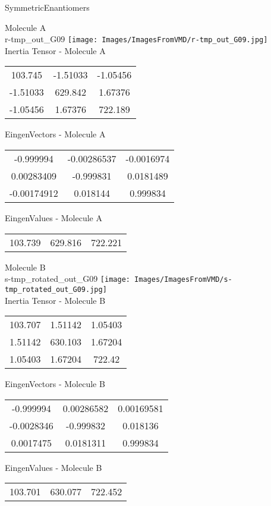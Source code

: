 \vtab[-2cm]
\begin{center}
{\large SymmetricEnantiomers}
\end{center}
\begin{multicols}{2}
\begin{center}
Molecule A \\ 
r-tmp\_out\_G09
\texttt{[image: Images/ImagesFromVMD/r-tmp\_out\_G09.jpg]}
\\
Inertia Tensor - Molecule A \\
\vtab
\begin{tabular}{|c c c|}
103.745	 & 	-1.51033	 & 	-1.05456	 \\
-1.51033	 & 	629.842	 & 	1.67376	 \\
-1.05456	 & 	1.67376	 & 	722.189
\end{tabular}

\vtab
 EingenVectors - Molecule A     \\
\vtab
\begin{tabular}{|c c c|}
-0.999994	 & 	-0.00286537	 & 	-0.0016974	 \\
0.00283409	 & 	-0.999831	 & 	0.0181489	 \\
-0.00174912	 & 	0.018144	 & 	0.999834
\end{tabular}

\vtab
 EingenValues - Molecule A     \\
\vtab
\begin{tabular}{|c c c|}
103.739	 & 	629.816	 & 	722.221
\end{tabular}
\columnbreak

Molecule B \\ 
s-tmp\_rotated\_out\_G09
\texttt{[image: Images/ImagesFromVMD/s-tmp\_rotated\_out\_G09.jpg]}
\\
Inertia Tensor - Molecule B \\
\vtab
\begin{tabular}{|c c c|}
103.707	 & 	1.51142	 & 	1.05403	 \\
1.51142	 & 	630.103	 & 	1.67204	 \\
1.05403	 & 	1.67204	 & 	722.42
\end{tabular}

\vtab
 EingenVectors - Molecule B     \\
\vtab
\begin{tabular}{|c c c|}
-0.999994	 & 	0.00286582	 & 	0.00169581	 \\
-0.0028346	 & 	-0.999832	 & 	0.018136	 \\
0.0017475	 & 	0.0181311	 & 	0.999834
\end{tabular}

\vtab
 EingenValues - Molecule B     \\
\vtab
\begin{tabular}{|c c c|}
103.701	 & 	630.077	 & 	722.452
\end{tabular}

\end{center}
\end{multicols}
